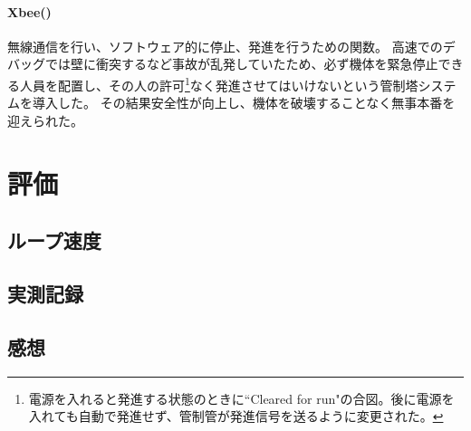 \documentclass{ltjsreport}
\begin{document}
\subsubsection{Xbee()}
無線通信を行い、ソフトウェア的に停止、発進を行うための関数。
高速でのデバッグでは壁に衝突するなど事故が乱発していたため、必ず機体を緊急停止できる人員を配置し、その人の許可\footnote{電源を入れると発進する状態のときに``Cleared for run"の合図。後に電源を入れても自動で発進せず、管制管が発進信号を送るように変更された。}なく発進させてはいけないという管制塔システムを導入した。
その結果安全性が向上し、機体を破壊することなく無事本番を迎えられた。




\chapter{評価}

\section{ループ速度}


\section{実測記録}


\section{感想}




\appendix




\end{document}
